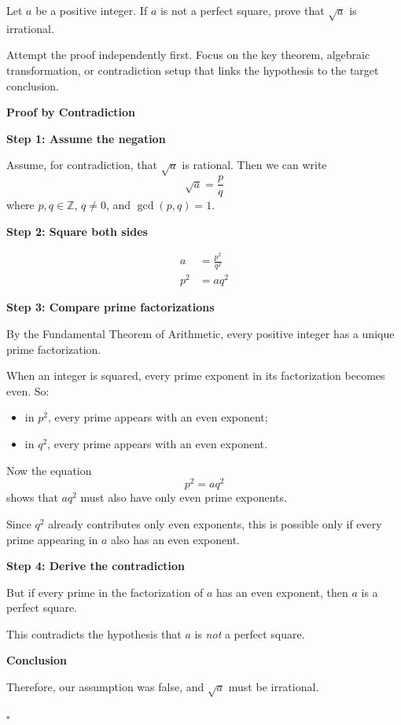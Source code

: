 
\begin{problem}
Let $a$ be a positive integer. If $a$ is not a perfect square, prove that $\sqrt{a}$ is irrational.
\end{problem}

\begin{hint}
Attempt the proof independently first. Focus on the key theorem, algebraic transformation, or contradiction setup that links the hypothesis to the target conclusion.
\end{hint}

\begin{solution}
\textbf{Proof by Contradiction}

\textbf{Step 1: Assume the negation}

Assume, for contradiction, that $\sqrt{a}$ is rational.
Then we can write
\[
\sqrt{a} = \frac{p}{q}
\]
where $p, q \in \mathbb{Z}$, $q \neq 0$, and $\gcd(p,q) = 1$.

\textbf{Step 2: Square both sides}

\begin{align*}
a &= \frac{p^2}{q^2} \\
p^2 &= aq^2
\end{align*}

\textbf{Step 3: Compare prime factorizations}

By the Fundamental Theorem of Arithmetic, every positive integer has a unique prime factorization.

When an integer is squared, every prime exponent in its factorization becomes even.
So:
\begin{itemize}
    \item in $p^2$, every prime appears with an even exponent;
    \item in $q^2$, every prime appears with an even exponent.
\end{itemize}

Now the equation
\[
p^2 = aq^2
\]
shows that $aq^2$ must also have only even prime exponents.

Since $q^2$ already contributes only even exponents, this is possible only if every prime appearing in $a$ also has an even exponent.

\textbf{Step 4: Derive the contradiction}

But if every prime in the factorization of $a$ has an even exponent, then $a$ is a perfect square.

This contradicts the hypothesis that $a$ is \emph{not} a perfect square.

\textbf{Conclusion}

Therefore, our assumption was false, and $\sqrt{a}$ must be irrational.

\hfill $\square$
\end{solution}

